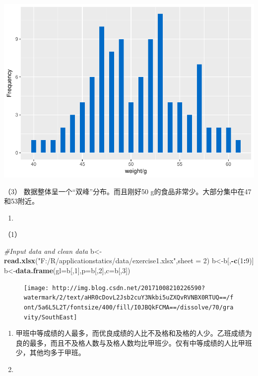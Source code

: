 \documentclass[]{article}
\newenvironment{Shaded}{\begin{snugshade}}{\end{snugshade}}
\newcommand{\KeywordTok}[1]{\textcolor[rgb]{0.13,0.29,0.53}{\textbf{#1}}}
\newcommand{\DataTypeTok}[1]{\textcolor[rgb]{0.13,0.29,0.53}{#1}}
\newcommand{\DecValTok}[1]{\textcolor[rgb]{0.00,0.00,0.81}{#1}}
\newcommand{\StringTok}[1]{\textcolor[rgb]{0.31,0.60,0.02}{#1}}
\newcommand{\CommentTok}[1]{\textcolor[rgb]{0.56,0.35,0.01}{\textit{#1}}}
\newcommand{\OperatorTok}[1]{\textcolor[rgb]{0.81,0.36,0.00}{\textbf{#1}}}
\newcommand{\NormalTok}[1]{#1}
\begin{document}
\includegraphics{Chapter14_files/figure-latex/unnamed-chunk-4-1.pdf}

（3） 数据整体呈一个``双峰''分布。而且刚好50
g的食品非常少。大部分集中在47和53附近。

\begin{enumerate}
\def\labelenumi{\arabic{enumi}.}
\setcounter{enumi}{1}
\item
\end{enumerate}

（1）

\begin{Shaded}
\begin{Highlighting}[]
\CommentTok{#Input data and clean data}
\NormalTok{b<-}\KeywordTok{read.xlsx}\NormalTok{(}\StringTok{"F:/R/applicationstatics/data/exercise1.xlsx"}\NormalTok{,}\DataTypeTok{sheet =} \DecValTok{2}\NormalTok{)}
\NormalTok{b<-b[,}\OperatorTok{-}\KeywordTok{c}\NormalTok{(}\DecValTok{1}\OperatorTok{:}\DecValTok{9}\NormalTok{)]}
\NormalTok{b<-}\KeywordTok{data.frame}\NormalTok{(}\DataTypeTok{gl=}\NormalTok{b[,}\DecValTok{1}\NormalTok{],}\DataTypeTok{p=}\NormalTok{b[,}\DecValTok{2}\NormalTok{],}\DataTypeTok{c=}\NormalTok{b[,}\DecValTok{3}\NormalTok{])}
\end{Highlighting}
\end{Shaded}

\begin{figure}
\centering
\texttt{[image: http://img.blog.csdn.net/20171008210226590?watermark/2/text/aHR0cDovL2Jsb2cuY3Nkbi5uZXQvRVNBX0RTUQ==/font/5a6L5L2T/fontsize/400/fill/I0JBQkFCMA==/dissolve/70/gravity/SouthEast]}
\caption{}
\end{figure}

\begin{enumerate}
\def\labelenumi{(\arabic{enumi})}
\setcounter{enumi}{1}
\item
  甲班中等成绩的人最多，而优良成绩的人比不及格和及格的人少。乙班成绩为良的最多，而且不及格人数与及格人数均比甲班少。仅有中等成绩的人比甲班少，其他均多于甲班。
\item
\end{enumerate}
\end{document}
